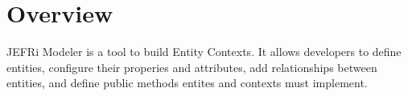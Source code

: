 \documentclass{article}
\begin{document}
\maketitle
\tableofcontents
\newpage

\section{Overview}
JEFRi Modeler is a tool to build Entity Contexts. It allows developers to define
entities, configure their properies and attributes, add relationships between
entities, and define public methods entites and contexts must implement.
\end{document}
